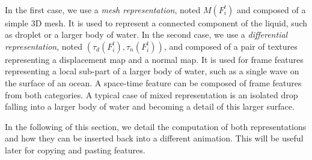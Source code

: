 \\
In the first case, we use a \emph{mesh representation}, noted $M(F^t_i)$ and composed of a simple $3$D mesh. 
It is used to represent a connected component of the liquid, such as droplet or a larger body of water.
In the second case, we use a \emph{differential representation}, noted $(\tau_d(F^t_i), \tau_n(F^t_i))$, and composed of a pair of textures representing a displacement map and a normal map.
It is used for frame features representing a local sub-part of a larger body of water, such as a single wave on the surface of an ocean.
A space-time feature can be composed of frame features from both categories.
A typical case of mixed representation is an isolated drop falling into a larger body of water and becoming a detail of this larger surface.

In the following of this section, we detail the computation of both representations and how they can be inserted back into a different animation. This will be useful later for copying and pasting features.

